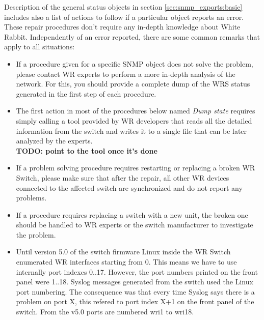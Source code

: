 Description of the general status objects in section
\ref{sec:snmp_exports:basic} includes also a list of actions to follow if a
particular object reports an error. These repair procedures don't require any
in-depth knowledge about White Rabbit. Independently of an error reported, there
are some common remarks that apply to all situations:
\begin{itemize}
  \item If a procedure given for a specific SNMP object does not solve the
    problem, please contact WR experts to perform a more in-depth analysis of
    the network. For this, you should provide a complete dump of the WRS status
    generated in the first step of each procedure.
  \item The first action in most of the procedures below named \emph{Dump state}
    requires simply calling a tool provided by WR developers that reads all the
    detailed information from the switch and writes it to a single file that can
    be later analyzed by the experts.\\
    {\bf TODO: point to the tool once it's done}
  \item If a problem solving procedure requires restarting or replacing a broken
    WR Switch, please make sure that after the repair, all other WR devices
    connected to the affected switch are synchronized and do not report any
    problems.
  \item If a procedure requires replacing a switch with a new unit, the broken
    one should be handled to WR experts or the switch manufacturer to
    investigate the problem.
  \item Until version 5.0 of the switch firmware
    Linux inside the WR Switch enumerated WR interfaces starting from 0.
    This means we have to use internally port indexes 0..17. However, the
    port numbers printed on the front panel were 1..18. Syslog messages
    generated from the switch used the Linux port numbering. The consequence
    was that every time Syslog says there is a problem on port X, this refered
    to port index X+1 on the front panel of the switch. From the v5.0 ports are
    numbered wri1 to wri18.
\end{itemize}


